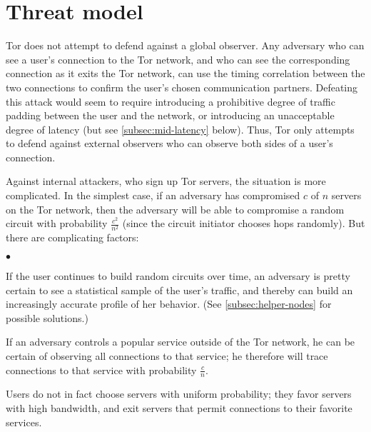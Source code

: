 \documentclass{llncs}
\newenvironment{tightlist}{\begin{list}{$\bullet$}{
  \setlength{\itemsep}{0mm}
    \setlength{\parsep}{0mm}
    }}{\end{list}}
\begin{document}
\section{Threat model}

Tor does not attempt to defend against a global observer.  Any adversary who
can see a user's connection to the Tor network, and who can see the
corresponding connection as it exits the Tor network, can use the timing
correlation between the two connections to confirm the user's chosen
communication partners.  Defeating this attack would seem to require
introducing a prohibitive degree of traffic padding between the user and the
network, or introducing an unacceptable degree of latency (but see
\ref{subsec:mid-latency} below).  Thus, Tor only
attempts to defend against external observers who can observe both sides of a
user's connection.

Against internal attackers, who sign up Tor servers, the situation is more
complicated.  In the simplest case, if an adversary has compromised $c$ of
$n$ servers on the Tor network, then the adversary will be able to compromise
a random circuit with probability $\frac{c^2}{n^2}$ (since the circuit
initiator chooses hops randomly).  But there are
complicating factors:
\begin{tightlist}
\item If the user continues to build random circuits over time, an adversary
  is pretty certain to see a statistical sample of the user's traffic, and
  thereby can build an increasingly accurate profile of her behavior.  (See
  \ref{subsec:helper-nodes} for possible solutions.)
\item If an adversary controls a popular service outside of the Tor network,
  he can be certain of observing all connections to that service; he
  therefore will trace connections to that service with probability
  $\frac{c}{n}$.
\item Users do not in fact choose servers with uniform probability; they
  favor servers with high bandwidth, and exit servers that permit connections
  to their favorite services.
\end{tightlist}

%
\end{document}
